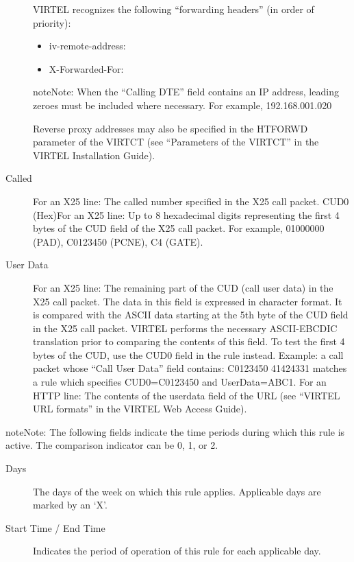 \documentclass[letterpaper,10pt,english]{sphinxmanual}
\begin{document}
\begin{description}
VIRTEL recognizes the following “forwarding headers” (in order of priority):
\begin{itemize}
\item {} 
iv-remote-address:

\item {} 
X-Forwarded-For:

\end{itemize}

\begin{sphinxadmonition}{note}{Note:}
When the “Calling DTE” field contains an IP address, leading zeroes must be included where necessary. For example, 192.168.001.020
\end{sphinxadmonition}

Reverse proxy addresses may also be specified in the HTFORWD parameter of the VIRTCT (see “Parameters of the VIRTCT” in the VIRTEL Installation Guide).

\item[{Called}] \leavevmode
For an X25 line: The called number specified in the X25 call packet. CUD0 (Hex)For an X25 line: Up to 8 hexadecimal digits representing the first 4 bytes of the CUD field of the X25 call packet. For example, 01000000 (PAD), C0123450 (PCNE), C4 (GATE).

\item[{User Data}] \leavevmode
For an X25 line: The remaining part of the CUD (call user data) in the X25 call packet. The data in this field is expressed in character format. It is compared with the ASCII data starting at the 5th byte of the CUD field in the X25 call packet. VIRTEL performs the necessary ASCII-EBCDIC translation prior to comparing the contents of this field. To test the first 4 bytes of the CUD, use the CUD0 field in the rule instead. Example: a call packet whose “Call User Data” field contains: C0123450 41424331 matches a rule which specifies CUD0=C0123450 and UserData=ABC1. For an HTTP line: The contents of the userdata field of the URL (see “VIRTEL URL formats” in the VIRTEL Web Access Guide).

\end{description}

\begin{sphinxadmonition}{note}{Note:}
The following fields indicate the time periods during which this rule is active. The comparison indicator can be 0, 1, or 2.
\end{sphinxadmonition}
\begin{description}
\item[{Days}] \leavevmode
The days of the week on which this rule applies. Applicable days are marked by an ‘X’.

\item[{Start Time / End Time}] \leavevmode
Indicates the period of operation of this rule for each applicable day.

\end{description}
\end{document}
